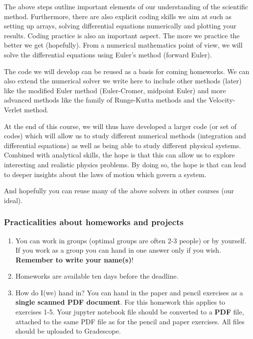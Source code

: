 \documentclass[11pt]{article}
\begin{document}
The above steps outline important elements of our understanding of the
scientific method. Furthermore, there are also explicit coding skills we
aim at such as setting up arrays, solving differential equations
numerically and plotting your results. Coding practice is also an
important aspect. The more we practice the better we get (hopefully).
From a numerical mathematics point of view, we will solve the
differential equations using Euler's method (forward Euler).

The code we will develop can be reused as a basis for coming homeworks.
We can also extend the numerical solver we write here to include other
methods (later) like the modified Euler method (Euler-Cromer, midpoint
Euler) and more advanced methods like the family of Runge-Kutta methods
and the Velocity-Verlet method.

At the end of this course, we will thus have developed a larger code (or
set of codes) which will allow us to study different numerical methods
(integration and differential equations) as well as being able to study
different physical systems. Combined with analytical skills, the hope is
that this can allow us to explore interesting and realistic physics
problems. By doing so, the hope is that can lead to deeper insights
about the laws of motion which govern a system.

And hopefully you can reuse many of the above solvers in other courses
(our ideal).

\subsubsection{Practicalities about homeworks and
projects}\label{practicalities-about-homeworks-and-projects}

\begin{enumerate}
\def\labelenumi{\arabic{enumi}.}
\item
  You can work in groups (optimal groups are often 2-3 people) or by
  yourself. If you work as a group you can hand in one answer only if
  you wish. \textbf{Remember to write your name(s)}!
\item
  Homeworks are available ten days before the deadline.
\item
  How do I(we) hand in? You can hand in the paper and pencil exercises
  as a \textbf{single scanned PDF document}. For this homework this
  applies to exercises 1-5. Your jupyter notebook file should be
  converted to a \textbf{PDF} file, attached to the same PDF file as for
  the pencil and paper exercises. All files should be uploaded to
  Gradescope.
\end{enumerate}
\end{document}

